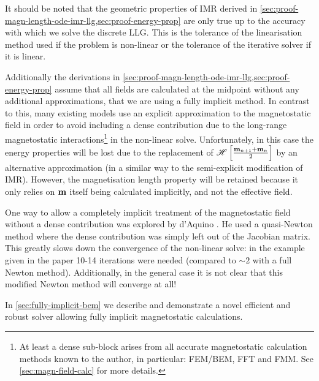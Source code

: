 It should be noted that the geometric properties of IMR derived in \cref{sec:proof-magn-length-ode-imr-llg,sec:proof-energy-prop} are only true up to the accuracy with which we solve the discrete LLG.
This is the tolerance of the linearisation method used if the problem is non-linear or the tolerance of the iterative solver if it is linear. 

Additionally the derivations in \cref{sec:proof-magn-length-ode-imr-llg,sec:proof-energy-prop} assume that all fields are calculated at the midpoint without any additional approximations, \ie that we are using a fully implicit method.
In contrast to this, many existing models use an explicit approximation to the magnetostatic field in order to avoid including a dense contribution due to the long-range magnetostatic interactions\footnote{At least a dense sub-block arises from all accurate magnetostatic calculation methods known to the author, in particular: FEM/BEM, FFT and FMM. See \cref{sec:magn-field-calc} for more details.} in the non-linear solve.
Unfortunately, in this case the energy properties will be lost due to the replacement of $\mathscr{H} \left[ \frac{\mathbf{m}_{n+1} + \mathbf{m}_n}{2} \right]$ by an alternative approximation (in a similar way to the semi-explicit modification of IMR).
However, the magnetisation length property will be retained because it only relies on $\mathbf{m}$ itself being calculated implicitly, and not the effective field.


One way to allow a completely implicit treatment of the magnetostatic field without a dense contribution was explored by d'Aquino \cite{DAquino2005}.
He used a quasi-Newton method where the dense contribution was simply left out of the Jacobian matrix.
This greatly slows down the convergence of the non-linear solve: in the example given in the paper 10-14 iterations were needed (compared to $\sim2$ with a full Newton method).
Additionally, in the general case it is not clear that this modified Newton method will converge at all!

In \cref{sec:fully-implicit-bem} we describe and demonstrate a novel efficient and robust solver allowing fully implicit magnetostatic calculations.


